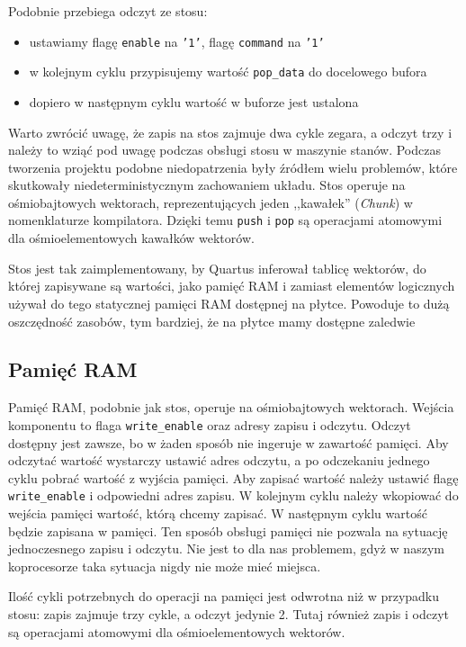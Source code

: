 Podobnie przebiega odczyt ze stosu:
\begin{itemize}
  \item ustawiamy flagę \texttt{enable} na \texttt{'1'}, flagę \texttt{command} na \texttt{'1'}
  \item w kolejnym cyklu przypisujemy wartość \texttt{pop\_data} do docelowego bufora
  \item dopiero w następnym cyklu wartość w buforze jest ustalona
\end{itemize}

Warto zwrócić uwagę, że zapis na stos zajmuje dwa cykle zegara, a odczyt trzy i należy to wziąć pod uwagę podczas obsługi stosu w maszynie stanów. Podczas tworzenia projektu podobne niedopatrzenia były źródłem wielu problemów, które skutkowały niedeterministycznym zachowaniem układu. Stos operuje na ośmiobajtowych wektorach, reprezentujących jeden ,,kawałek'' (\textit{Chunk}) w nomenklaturze kompilatora. Dzięki temu \texttt{push} i \texttt{pop} są operacjami atomowymi dla ośmioelementowych kawałków wektorów.

Stos jest tak zaimplementowany, by Quartus inferował tablicę wektorów, do której zapisywane są wartości, jako pamięć RAM i zamiast elementów logicznych używał do tego statycznej pamięci RAM dostępnej na płytce. Powoduje to dużą oszczędność zasobów, tym bardziej, że na płytce mamy dostępne zaledwie 

\subsection{Pamięć RAM}

Pamięć RAM, podobnie jak stos, operuje na ośmiobajtowych wektorach. Wejścia komponentu to flaga \texttt{write\_enable} oraz adresy zapisu i odczytu. Odczyt dostępny jest zawsze, bo w żaden sposób nie ingeruje w zawartość pamięci. Aby odczytać wartość wystarczy ustawić adres odczytu, a po odczekaniu jednego cyklu pobrać wartość z wyjścia pamięci. Aby zapisać wartość należy ustawić flagę \texttt{write\_enable} i odpowiedni adres zapisu. W kolejnym cyklu należy wkopiować do wejścia pamięci wartość, którą chcemy zapisać. W następnym cyklu wartość będzie zapisana w pamięci. Ten sposób obsługi pamięci nie pozwala na sytuację jednoczesnego zapisu i odczytu. Nie jest to dla nas problemem, gdyż w naszym koprocesorze taka sytuacja nigdy nie może mieć miejsca.

Ilość cykli potrzebnych do operacji na pamięci jest odwrotna niż w przypadku stosu: zapis zajmuje trzy cykle, a odczyt jedynie 2. Tutaj również zapis i odczyt są operacjami atomowymi dla ośmioelementowych wektorów.


